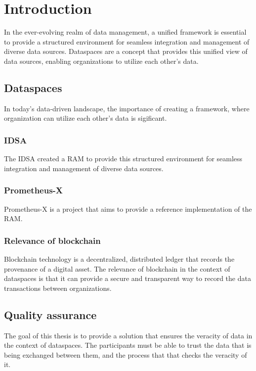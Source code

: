 \chapter{Introduction}

In the ever-evolving realm of data management, a unified framework is essential to provide a structured environment for seamless integration and management of diverse data sources. Dataspaces are a concept that provides this unified view of data sources, enabling organizations to utilize each other's data.

\section{Dataspaces}

In today's data-driven landscape, the importance of creating a framework, where organization can utilize each other's data is sigificant.

\subsection{IDSA}

The \ac{IDSA} created a \ac{RAM}\cite{ids-ram} to provide this structured environment for seamless integration and management of diverse data sources.

\subsection{Prometheus-X}

Prometheus-X is a project that aims to provide a reference implementation of the \ac{RAM}.

\subsection{Relevance of blockchain}

Blockchain technology is a decentralized, distributed ledger that records the provenance of a digital asset. The relevance of blockchain in the context of dataspaces is that it can provide a secure and transparent way to record the data transactions between organizations.

\section{Quality assurance}
 
The goal of this thesis is to provide a solution that ensures the veracity of data in the context of dataspaces. The participants must be able to trust the data that is being exchanged between them, and the process that that checks the veracity of it.

